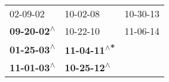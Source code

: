 \begin{supertabular}{lll}
                  02-09-02\textsuperscript{} &                    10-02-08\textsuperscript{} &  10-30-13\textsuperscript{} \\
 \textbf{09-20-02\textsuperscript{$\wedge$}} &                    10-22-10\textsuperscript{} &  11-06-14\textsuperscript{} \\
 \textbf{01-25-03\textsuperscript{$\wedge$}} &  \textbf{11-04-11\textsuperscript{$\wedge$*}} &                             \\
 \textbf{11-01-03\textsuperscript{$\wedge$}} &   \textbf{10-25-12\textsuperscript{$\wedge$}} &                             \\
\end{supertabular}
